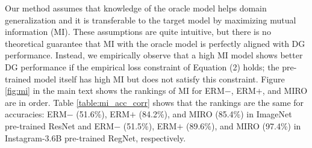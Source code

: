Our method assumes that knowledge of the oracle model helps domain generalization and it is transferable to the target model by maximizing mutual information (MI). These assumptions are quite intuitive, but there is no theoretical guarantee that MI with the oracle model is perfectly aligned with DG performance. Instead, we empirically observe that a high MI model shows better DG performance if the empirical loss constraint of Equation (2) holds; the pre-trained model itself has high MI but does not satisfy this constraint.
Figure \ref{fig:mi} in the main text shows the rankings of MI for ERM$-$, ERM$+$, and MIRO are in order. Table \ref{table:mi_acc_corr} shows that the rankings are the same for accuracies: ERM$-$ (51.6\%), ERM$+$ (84.2\%), and MIRO (85.4\%) in ImageNet pre-trained ResNet and ERM$-$ (51.5\%), ERM$+$ (89.6\%), and MIRO (97.4\%) in Instagram-3.6B pre-trained RegNet, respectively.


% 



